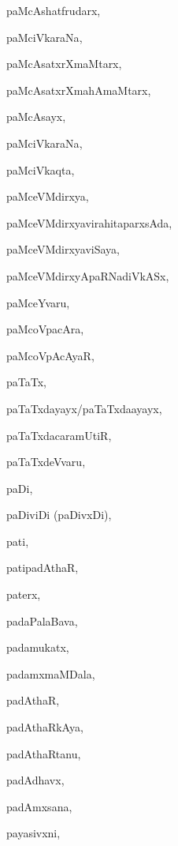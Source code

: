 \begin{multicols}{2}
{paMcAshatfrudarx}, \pageref{paMcAshatfrudarx}

{paMciVkaraNa}, \pageref{paMciVkaraNa1}

{paMcAsatxrXmaMtarx}, \pageref{paMcAsatxrXmaMtarx}

{paMcAsatxrXmahAmaMtarx}, \pageref{paMcAsatxrXmahAmaMtarx}

{paMcAsayx}, \pageref{paMcAsayx}

{paMciVkaraNa}, \pageref{paMciVkaraNa2}

{paMciVkaqta}, \pageref{paMciVkaqta}

{paMceVMdirxya}, \pageref{paMceVMdirxya}

{paMceVMdirxyavirahitaparxsAda}, \pageref{paMceVMdirxyavirahitaparxsAda}

{paMceVMdirxyaviSaya}, \pageref{paMceVMdirxyaviSaya}

{paMceVMdirxyApaRNadiVkASx}, \pageref{paMceVMdirxyApaRNadiVkASx}

{paMceYvaru}, \pageref{paMceYvaru}

{paMcoVpacAra}, \pageref{paMcoVpacAra}

{paMcoVpAcAyaR}, \pageref{paMcoVpAcAyaR}

{paTaTx}, \pageref{paTaTx}

{paTaTxdayayx/paTaTxda{a}yayx}, \pageref{paTaTxdayayxpaTaTxdaayayx}

{paTaTxdacaramUtiR}, \pageref{paTaTxdacaramUtiR}

{paTaTxdeVvaru}, \pageref{paTaTxdeVvaru}

{paDi}, \pageref{paDi}

{paDiviDi (paDivxDi)}, \pageref{paDiviDipaDivxDi}

{pati}, \pageref{pati}

{patipadAthaR}, \pageref{patipadAthaR}

{paterx}, \pageref{paterx}

{padaPalaBava}, \pageref{padaPalaBava}

{padamukatx}, \pageref{padamukatx}

{padamxmaMDala}, \pageref{padamxmaMDala}

{padAthaR}, \pageref{padAthaR}

{padAthaRkAya}, \pageref{padAthaRkAya}

{padAthaRtanu}, \pageref{padAthaRtanu}

{padAdhavx}, \pageref{padAdhavx}

{padAmxsana}, \pageref{padAmxsana}

{payasivxni}, \pageref{payasivxni}


\end{multicols}
